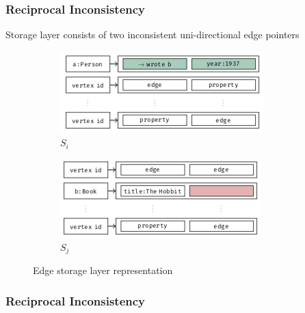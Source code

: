 \begin{frame}
  \frametitle{Reciprocal Inconsistency}
  Storage layer consists of two inconsistent uni-directional edge pointers
  \begin{figure}
    \centering
    \begin{subfigure}{.5\textwidth}
      \centering
      \includegraphics[width=.9\linewidth]{./images/si}
      \caption{$S_i$}
      \label{fig:sub1}
    \end{subfigure}%
    \begin{subfigure}{.5\textwidth}
      \centering
      \includegraphics[width=.9\linewidth]{./images/sj}
      \caption{$S_j$}
      \label{fig:sub2}
    \end{subfigure}
    \caption{Edge storage layer representation}
    \label{fig:test}
  \end{figure}
\end{frame}

\begin{frame}
  \frametitle{Reciprocal Inconsistency}
  \begin{itemize}
  \end{itemize}
\end{frame}